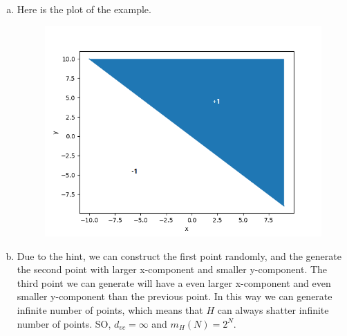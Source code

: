 \documentclass[11pt]{article}
\begin{document}
\begin{enumerate} [(a)]
	\item
	Here is the plot of the example.
	\begin{figure}[htb]
		{\includegraphics{p2_15.png}}
	\end{figure}
	\item Due to the hint, we can construct the first point randomly, and the generate the second point with larger x-component and smaller y-component. The third point we can generate will have a even larger x-component and even smaller y-component than the previous point. In this way we can generate infinite number of points, which means that $H$ can always shatter infinite number of points. SO, $d_{vc}=\infty$ and $m_H(N)=2^N$.
\end{enumerate}

\newpage
\end{document}
